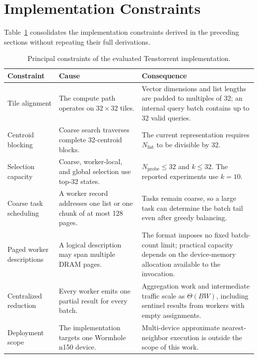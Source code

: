 \section{Implementation Constraints}
\label{sec:implementation-constraints}

Table~\ref{tab:implementation-constraints} consolidates the implementation constraints derived in the preceding sections without repeating their full derivations.

\begin{table}[htbp]
\centering
\caption{Principal constraints of the evaluated Tenstorrent implementation.}
\label{tab:implementation-constraints}
\small
\setlength{\tabcolsep}{5pt}
\renewcommand{\arraystretch}{1.12}
\begin{tabularx}{\textwidth}{p{} p{} X}
\toprule
Constraint & Cause & Consequence \\
\midrule
Tile alignment
& The compute path operates on \(32\times32\) tiles.
& Vector dimensions and list lengths are padded to multiples of 32; an
  internal query batch contains up to 32 valid queries. \\

Centroid blocking
& Coarse search traverses complete 32-centroid blocks.
& The current representation requires \(N_{\mathrm{list}}\) to be divisible
  by 32. \\

Selection capacity
& Coarse, worker-local, and global selection use top-32 states.
& \(N_{\mathrm{probe}}\leq32\) and \(k\leq32\). The reported experiments use
  \(k=10\). \\

Coarse task scheduling
& A worker record addresses one list or one chunk of at most 128 pages.
& Tasks remain coarse, so a large task can determine the batch tail even
  after greedy balancing. \\

Paged worker descriptions
& A logical description may span multiple DRAM pages.
& The format imposes no fixed batch-count limit; practical capacity depends
  on the device-memory allocation available to the invocation. \\

Centralized reduction
& Every worker emits one partial result for every batch.
& Aggregation work and intermediate traffic scale as \(\Theta(BW)\), including
  sentinel results from workers with empty assignments. \\

Deployment scope
& The implementation targets one Wormhole n150 device.
& Multi-device approximate nearest-neighbor execution is outside the scope
  of this work. \\
\bottomrule
\end{tabularx}
\end{table}

